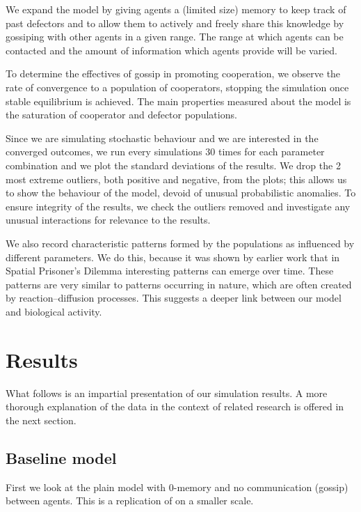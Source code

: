 \documentclass[english]{article}
\begin{document}
We expand the model by giving agents a (limited size) memory to keep track of past defectors and to allow them to actively and freely share this knowledge by gossiping with other agents in a given range.
The range at which agents can be contacted and the amount of information which agents provide will be varied.

To determine the effectives of gossip in promoting cooperation, we observe the rate of convergence to a population of cooperators, stopping the simulation once stable equilibrium is achieved.
The main properties measured about the model is the saturation of cooperator and defector populations.

Since we are simulating stochastic behaviour and we are interested in the converged outcomes,
we run every simulations 30 times for each parameter combination and we plot the standard deviations of the results.
We drop the 2 most extreme outliers, both positive and negative, from the plots; this allows us to show the behaviour of the model, devoid of unusual probabilistic anomalies.
To ensure integrity of the results, we check the outliers removed and investigate any unusual interactions for relevance to the results.

We also record characteristic patterns formed by the populations as influenced by different parameters.
We do this, because it was shown by earlier work \citep{spatial-patterns} that in Spatial Prisoner's Dilemma interesting patterns can emerge over time.
These patterns are very similar to patterns occurring in nature, which are often created by reaction--diffusion processes.
This suggests a deeper link between our model and biological activity.



\section{Results}
What follows is an impartial presentation of our simulation results.
A more thorough explanation of the data in the context of related research
is offered in the next section.

\subsection{Baseline model}
First we look at the plain model with 0-memory and no communication (gossip) between agents.
This is a replication of \citet{smaldino} on a smaller scale.
\end{document}
